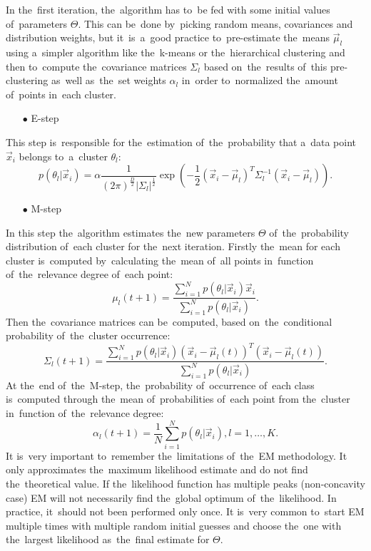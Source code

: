 In the~first iteration, the~algorithm has to~be fed with some initial values of~parameters $\Theta$. This can be~done by~picking random means, covariances and distribution weights, but it~is~a~good practice to~pre-estimate the~means $\overrightarrow{\mu}_l$ using a~simpler algorithm like the~k-means or the~hierarchical clustering and then to~compute the~covariance matrices $\Sigma_l$ based on~the~results of~this pre-clustering as~well as~the~set weights $\alpha_l$ in~order to~normalized the~amount of~points in~each cluster.
 \begin{itemize}
   \item[$\bullet$] E-step
 \end{itemize}
This step is~responsible for the~estimation of~the~probability that a~data point $\overrightarrow{x}_i$ belongs to~a~cluster $\theta_l$:
\begin{equation}
  p(\theta_l|\overrightarrow{x}_i)=\alpha \frac{1}{(2\pi)^{\frac{D}{2}}|\Sigma_l|^{\frac{1}{2}}}\exp\left(-\frac{1}{2}(\overrightarrow{x}_i-\overrightarrow{\mu}_l)^T\Sigma_l^{-1}(\overrightarrow{x}_i-\overrightarrow{\mu}_l)\right).
\end{equation}
  \begin{itemize}
    \item[$\bullet$] M-step
  \end{itemize}
In this step the~algorithm estimates the~new parameters $\Theta$ of~the~probability distribution of~each cluster for the~next iteration. Firstly the~mean for each cluster is~computed by~calculating the~mean of~all points in~function of~the~relevance degree of~each point:
\begin{equation}
  \mu_l(t+1)=\frac{\sum_{i=1}^N p(\theta_l|\overrightarrow{x}_i)\overrightarrow{x}_i}{\sum_{i=1}^N p(\theta_l|\overrightarrow{x}_i)}.
\end{equation}
Then the~covariance matrices can be~computed, based on~the~conditional probability of~the~cluster occurrence:
\begin{equation}
  \Sigma_l(t+1)=\frac{\sum_{i=1}^N p(\theta_l|\overrightarrow{x}_i)(\overrightarrow{x}_i-\overrightarrow{\mu}_l(t))^T(\overrightarrow{x}_i-\overrightarrow{\mu}_l(t))}{\sum_{i=1}^N p(\theta_l|\overrightarrow{x}_i)}.
\end{equation}
At the~end of~the~M-step, the~probability of~occurrence of~each class is~computed through the~mean of~probabilities of~each point from the~cluster in~function of~the~relevance degree:
\begin{equation}
  \alpha_l(t+1)=\frac{1}{N}\sum_{i=1}^{N}p(\theta_l|\overrightarrow{x}_i), l=1,\dots,K.
\end{equation}
It is~very important to~remember the~limitations of~the~EM methodology. It only approximates the~maximum likelihood estimate and do not find the~theoretical value. If the~likelihood function has multiple peaks (non-concavity case) EM will not necessarily find the~global optimum of~the~likelihood. In practice, it~should not been performed only once. It is~very common to~start EM multiple times with multiple random initial guesses and choose the~one with the~largest likelihood as~the~final estimate for $\Theta$.

